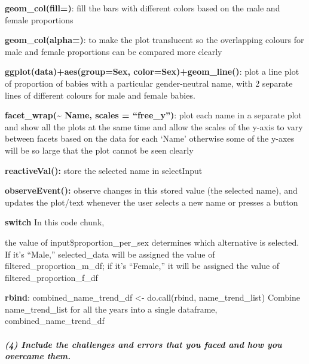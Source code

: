 \documentclass[
]{article}
\newenvironment{Shaded}{\begin{snugshade}}{\end{snugshade}}
\newcommand{\ControlFlowTok}[1]{\textcolor[rgb]{0.13,0.29,0.53}{\textbf{#1}}}
\newcommand{\NormalTok}[1]{#1}
\newcommand{\OtherTok}[1]{\textcolor[rgb]{0.56,0.35,0.01}{#1}}
\newcommand{\SpecialCharTok}[1]{\textcolor[rgb]{0.81,0.36,0.00}{\textbf{#1}}}
\newcommand{\StringTok}[1]{\textcolor[rgb]{0.31,0.60,0.02}{#1}}
\begin{document}
\textbf{geom\_col(fill=)}: fill the bars with different colors based on
the male and female proportions

\textbf{geom\_col(alpha=)}: to make the plot translucent so the
overlapping colours for male and female proportions can be compared more
clearly

\textbf{ggplot(data)+aes(group=Sex, color=Sex)+geom\_line()}: plot a
line plot of proportion of babies with a particular gender-neutral name,
with 2 separate lines of different colours for male and female babies.

\textbf{facet\_wrap(\textasciitilde{} Name, scales = ``free\_y'')}: plot
each name in a separate plot and show all the plots at the same time and
allow the scales of the y-axis to vary between facets based on the data
for each `Name' otherwise some of the y-axes will be so large that the
plot cannot be seen clearly

\textbf{reactiveVal():} store the selected name in selectInput

\textbf{observeEvent():} observe changes in this stored value (the
selected name), and updates the plot/text whenever the user selects a
new name or presses a button

\textbf{switch} In this code chunk,

\begin{Shaded}
\end{Shaded}

the value of input\$proportion\_per\_sex determines which alternative is
selected. If it's ``Male,'' selected\_data will be assigned the value of
filtered\_proportion\_m\_df; if it's ``Female,'' it will be assigned the
value of filtered\_proportion\_f\_df

\textbf{rbind}: combined\_name\_trend\_df \textless- do.call(rbind,
name\_trend\_list) Combine name\_trend\_list for all the years into a
single dataframe, combined\_name\_trend\_df

\hypertarget{include-the-challenges-and-errors-that-you-faced-and-how-you-overcame-them.}{%
\subparagraph{\texorpdfstring{\textbf{(4) Include the challenges and
errors that you faced and how you overcame
them.}}{(4) Include the challenges and errors that you faced and how you overcame them.}}\label{include-the-challenges-and-errors-that-you-faced-and-how-you-overcame-them.}}
\end{document}
